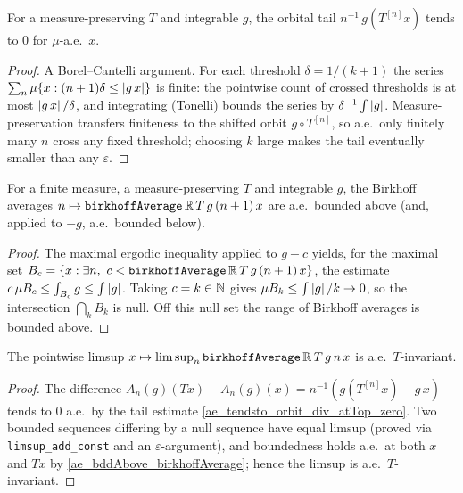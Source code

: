 \begin{lemma}\label{ae_tendsto_orbit_div_atTop_zero}
  \leanok
  For a measure-preserving \(T\) and integrable \(g\), the orbital tail
  \(n^{-1}\, g(T^{[n]}x)\) tends to \(0\) for \(\mu\)-a.e.\ \(x\).
\end{lemma}
\begin{proof}\leanok
  A Borel--Cantelli argument. For each threshold \(\delta = 1/(k+1)\) the series
  \(\sum_n \mu\{x : (n+1)\delta \le \left\lvert g\,x \right\rvert\}\) is finite: the pointwise count
  of crossed thresholds is at most \(\left\lvert g\,x \right\rvert/\delta\), and integrating
  (Tonelli) bounds the series by \(\delta^{-1}\int \left\lvert g \right\rvert\). Measure-preservation
  transfers finiteness to the shifted orbit \(g \circ T^{[n]}\), so a.e.\ only
  finitely many \(n\) cross any fixed threshold; choosing \(k\) large makes the
  tail eventually smaller than any \(\varepsilon\).
\end{proof}

\begin{lemma}\label{ae_bddAbove_birkhoffAverage}
  \leanok
  For a finite measure, a measure-preserving \(T\) and integrable \(g\), the
  Birkhoff averages \(n \mapsto \texttt{birkhoffAverage}\,\mathbb{R}\,T\,g\,(n+1)\,x\)
  are a.e.\ bounded above (and, applied to \(-g\), a.e.\ bounded below).
\end{lemma}
\begin{proof}\leanok
  The maximal ergodic inequality applied to \(g - c\) yields, for the maximal
  set \(B_c = \{x : \exists n,\ c < \texttt{birkhoffAverage}\,\mathbb{R}\,T\,g\,(n+1)\,x\}\),
  the estimate \(c\,\mu B_c \le \int_{B_c} g \le \int \left\lvert g \right\rvert\). Taking
  \(c = k \in \mathbb{N}\) gives \(\mu B_k \le \int\left\lvert g \right\rvert/k \to 0\), so the
  intersection \(\bigcap_k B_k\) is null. Off this null set the range of
  Birkhoff averages is bounded above.
\end{proof}

\begin{lemma}\label{limsup_birkhoffAverage_comp_ae}
  \leanok
  The pointwise limsup \(x \mapsto \limsup_n
  \texttt{birkhoffAverage}\,\mathbb{R}\,T\,g\,n\,x\) is a.e.\ \(T\)-invariant.
\end{lemma}
\begin{proof}\leanok
  The difference \(A_n(g)(Tx) - A_n(g)(x) = n^{-1}(g(T^{[n]}x) - g\,x)\) tends
  to \(0\) a.e.\ by the tail estimate \cref{ae_tendsto_orbit_div_atTop_zero}.
  Two bounded sequences differing by a null sequence have equal limsup (proved
  via \texttt{limsup\_add\_const} and an \(\varepsilon\)-argument), and
  boundedness holds a.e.\ at both \(x\) and \(Tx\) by
  \cref{ae_bddAbove_birkhoffAverage}; hence the limsup is a.e.\ \(T\)-invariant.
\end{proof}


